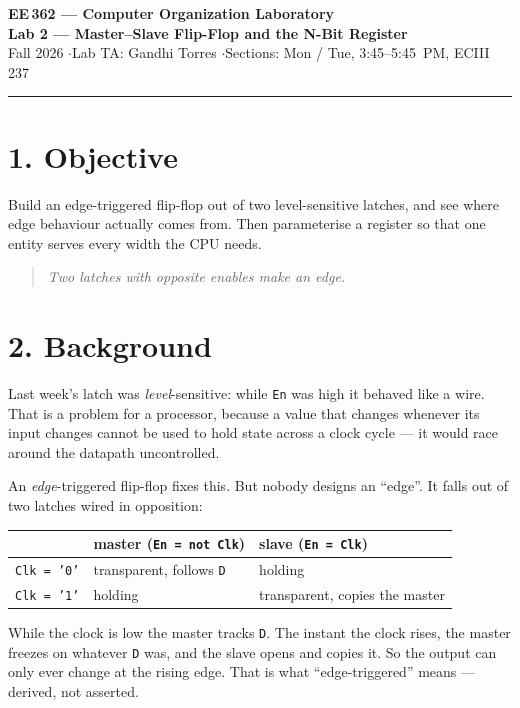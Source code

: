 \documentclass[11pt]{article}
\newcommand{\code}[1]{\texttt{#1}}
\newcommand{\hr}{\vspace{2pt}\hrule\vspace{6pt}}
\begin{document}
\begin{center}
{\Large\bfseries EE\,362 --- Computer Organization Laboratory}\\[2pt]
{\large\bfseries Lab 2 --- Master--Slave Flip-Flop and the N-Bit Register}\\[4pt]
Fall 2026 \quad$\cdot$\quad Lab TA: Gandhi Torres \quad$\cdot$\quad Sections: Mon / Tue, 3:45--5:45~PM, ECIII 237
\end{center}
\hr

\section*{1. Objective}

Build an edge-triggered flip-flop out of two level-sensitive latches, and see
where edge behaviour actually comes from. Then parameterise a register so that
one entity serves every width the CPU needs.

\begin{quote}
\emph{Two latches with opposite enables make an edge.}
\end{quote}

\section*{2. Background}

Last week's latch was \emph{level}-sensitive: while \code{En} was high it behaved
like a wire. That is a problem for a processor, because a value that changes
whenever its input changes cannot be used to hold state across a clock cycle ---
it would race around the datapath uncontrolled.

An \emph{edge}-triggered flip-flop fixes this. But nobody designs an ``edge''.
It falls out of two latches wired in opposition:

\begin{center}
\begin{tabular}{lll}
\toprule
& master (\code{En = not Clk}) & slave (\code{En = Clk}) \\
\midrule
\code{Clk = '0'} & transparent, follows \code{D} & holding \\
\code{Clk = '1'} & holding & transparent, copies the master \\
\bottomrule
\end{tabular}
\end{center}

While the clock is low the master tracks \code{D}. The instant the clock rises,
the master freezes on whatever \code{D} was, and the slave opens and copies it.
So the output can only ever change at the rising edge. That is what
``edge-triggered'' means --- derived, not asserted.
\end{document}
